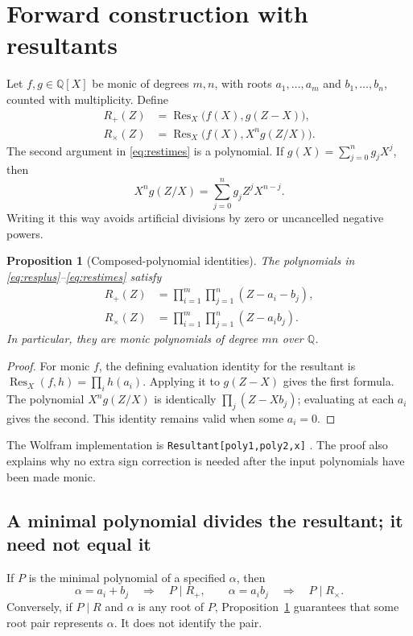 \documentclass[11pt,a4paper]{article}
\newcommand{\Q}{\mathbb Q}
\newcommand{\Res}{\operatorname{Res}}
\newcommand{\code}[1]{\texttt{#1}}
\newtheorem{proposition}[theorem]{Proposition}
\theoremstyle{definition}
\theoremstyle{remark}
\begin{document}
\section{Forward construction with resultants}
\label{sec:resultants}
Let $f,g\in\Q[X]$ be monic of degrees $m,n$, with roots $a_1,\ldots,a_m$ and $b_1,\ldots,b_n$, counted with multiplicity. Define
\begin{align}
 R_+(Z)&=\Res_X\bigl(f(X),g(Z-X)\bigr),\label{eq:resplus}\\
 R_{\times}(Z)&=\Res_X\bigl(f(X),X^ng(Z/X)\bigr).
 \label{eq:restimes}
\end{align}
The second argument in \eqref{eq:restimes} is a polynomial. If
$g(X)=\sum_{j=0}^n g_jX^j$, then
\[
 X^ng(Z/X)=\sum_{j=0}^n g_jZ^jX^{n-j}.
\]
Writing it this way avoids artificial divisions by zero or uncancelled negative powers.

\begin{proposition}[Composed-polynomial identities]
\label{prop:composed}
The polynomials in \eqref{eq:resplus}--\eqref{eq:restimes} satisfy
\begin{align*}
 R_+(Z)&=\prod_{i=1}^m\prod_{j=1}^n(Z-a_i-b_j),\\
 R_{\times}(Z)&=\prod_{i=1}^m\prod_{j=1}^n(Z-a_ib_j).
\end{align*}
In particular, they are monic polynomials of degree $mn$ over $\Q$.
\end{proposition}
\begin{proof}
For monic $f$, the defining evaluation identity for the resultant is
$\Res_X(f,h)=\prod_i h(a_i)$. Applying it to $g(Z-X)$ gives the first formula. The polynomial $X^ng(Z/X)$ is identically $\prod_j(Z-Xb_j)$; evaluating at each $a_i$ gives the second. This identity remains valid when some $a_i=0$.
\end{proof}
The Wolfram implementation is \code{Resultant[poly1,poly2,x]} \cite{resultant}. The proof also explains why no extra sign correction is needed after the input polynomials have been made monic.

\subsection{A minimal polynomial divides the resultant; it need not equal it}
If $P$ is the minimal polynomial of a specified $\alpha$, then
\[
 \alpha=a_i+b_j\quad\Longrightarrow\quad P\mid R_+,
 \qquad
 \alpha=a_ib_j\quad\Longrightarrow\quad P\mid R_{\times}.
\]
Conversely, if $P\mid R$ and $\alpha$ is any root of $P$, Proposition~\ref{prop:composed} guarantees that some root pair represents $\alpha$. It does not identify the pair.
\end{document}
